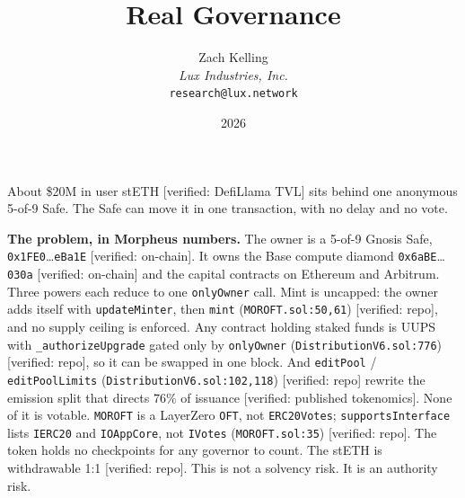 \documentclass[11pt,a4paper]{article}
\title{Real Governance}
\author{Zach Kelling\\\textit{Lux Industries, Inc.}\\\texttt{research@lux.network}}
\date{2026}
\newcommand{\code}[1]{\texttt{\small #1}}
\newcommand{\pv}[1]{{\color{muted}\sffamily\scriptsize[#1]}}
\begin{document}
\luxcoverpage
\sloppy

\par
\vspace{0.8ex}
\par
\vspace{0.7ex}
\noindent{\color{rule}\rule{\linewidth}{1.1pt}}\par
\vspace{1.0ex}

\noindent About \$20M in user stETH \pv{verified: DefiLlama TVL} sits behind one anonymous 5-of-9
Safe. The Safe can move it in one transaction, with no delay and no vote.

\vspace{1.0ex}
\noindent\textbf{The problem, in Morpheus numbers.}
The owner is a 5-of-9 Gnosis Safe, \code{0x1FE0}\dots\code{eBa1E} \pv{verified: on-chain}. It owns the
Base compute diamond \code{0x6aBE}\dots\code{030a} \pv{verified: on-chain} and the capital contracts on
Ethereum and Arbitrum. Three powers each reduce to one \code{onlyOwner} call.
Mint is uncapped: the owner adds itself with \code{updateMinter}, then \code{mint}
(\code{MOROFT.sol:50,61}) \pv{verified: repo}, and no supply ceiling is enforced.
Any contract holding staked funds is UUPS with \code{\_authorizeUpgrade} gated only by \code{onlyOwner}
(\code{DistributionV6.sol:776}) \pv{verified: repo}, so it can be swapped in one block.
And \code{editPool} / \code{editPoolLimits} (\code{DistributionV6.sol:102,118}) \pv{verified: repo}
rewrite the emission split that directs 76\% of issuance \pv{verified: published tokenomics}.
None of it is votable. \code{MOROFT} is a LayerZero \code{OFT}, not \code{ERC20Votes};
\code{supportsInterface} lists \code{IERC20} and \code{IOAppCore}, not \code{IVotes}
(\code{MOROFT.sol:35}) \pv{verified: repo}. The token holds no checkpoints for any governor to count.
The stETH is withdrawable 1:1 \pv{verified: repo}. This is not a solvency risk. It is an authority risk.
\end{document}
